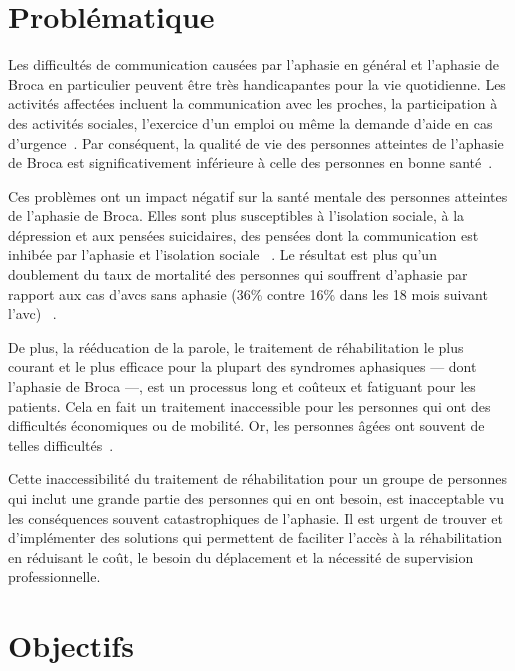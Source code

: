 \section*{Problématique}

Les difficultés de communication causées par l'aphasie en général 
et l'aphasie de Broca en particulier peuvent être très handicapantes pour la vie quotidienne.
Les activités affectées incluent la communication avec les proches, la participation à des activités sociales,
l'exercice d'un emploi ou même la demande d'aide en cas d'urgence~\cite{Hallowell_2017}.
Par conséquent, la qualité de vie des personnes atteintes de l'aphasie de Broca 
est significativement inférieure à celle des personnes en bonne santé~\cite{Pallavi_Perumal_Krupa_2018,Ross_Wertz_2010}.

Ces problèmes ont un impact négatif sur la santé mentale des personnes atteintes de l'aphasie de Broca.
Elles sont plus susceptibles à l'isolation sociale, à la dépression et aux pensées suicidaires,
des pensées dont la communication est inhibée par l'aphasie et l'isolation sociale%
~\cite{Costanza_et_al._2021,Morrison_2016}.
Le résultat est plus qu'un doublement du taux de mortalité des personnes qui souffrent d'aphasie
par rapport aux cas d'\glspl{avc} sans aphasie (36\% contre 16\% dans les 18 mois suivant l'\gls{avc})%
~\cite{Laska_Hellblom_Murray_Kahan_Von_Arbin_2001}.

De plus, la rééducation de la parole, le traitement de réhabilitation le plus courant et le plus efficace 
pour la plupart des syndromes aphasiques --- dont l'aphasie de Broca ---,
est un processus long et coûteux et fatiguant pour les patients.
Cela en fait un traitement inaccessible pour les personnes qui ont des difficultés économiques ou de mobilité.
Or, les personnes âgées ont souvent de telles difficultés~\cite{Jacobs_Ellis_2021,Liu_Huang_Xu_Wu_Tao_Chen_2021}.

Cette inaccessibilité du traitement de réhabilitation pour un groupe de personnes 
qui inclut une grande partie des personnes qui en ont besoin, 
est inacceptable vu les conséquences souvent catastrophiques de l'aphasie.
Il est urgent de trouver et d'implémenter des solutions qui permettent de faciliter l'accès à la réhabilitation
en réduisant le coût, le besoin du déplacement et la nécessité de supervision professionnelle.

\section*{Objectifs}

